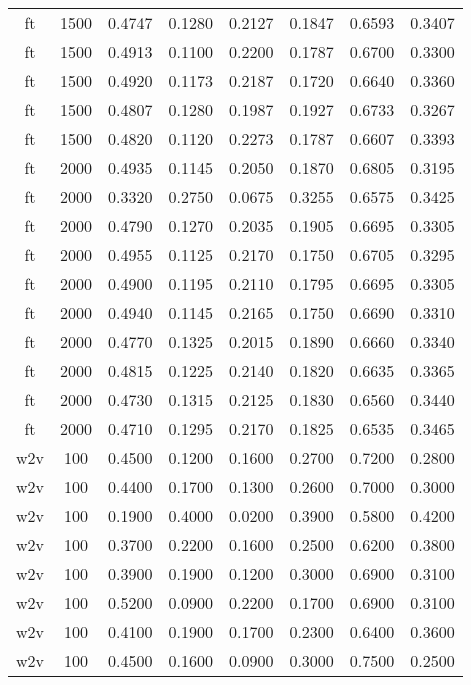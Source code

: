 \begin{scriptsize}
\begin{longtable}{cccccccc}
	ft       & 1500 & 0.4747 & 0.1280 & 0.2127 & 0.1847 & 0.6593 & 0.3407 \\
	ft       & 1500 & 0.4913 & 0.1100 & 0.2200 & 0.1787 & 0.6700 & 0.3300 \\
	ft       & 1500 & 0.4920 & 0.1173 & 0.2187 & 0.1720 & 0.6640 & 0.3360 \\
	ft       & 1500 & 0.4807 & 0.1280 & 0.1987 & 0.1927 & 0.6733 & 0.3267 \\
	ft       & 1500 & 0.4820 & 0.1120 & 0.2273 & 0.1787 & 0.6607 & 0.3393 \\
	ft       & 2000 & 0.4935 & 0.1145 & 0.2050 & 0.1870 & 0.6805 & 0.3195 \\
	ft       & 2000 & 0.3320 & 0.2750 & 0.0675 & 0.3255 & 0.6575 & 0.3425 \\
	ft       & 2000 & 0.4790 & 0.1270 & 0.2035 & 0.1905 & 0.6695 & 0.3305 \\
	ft       & 2000 & 0.4955 & 0.1125 & 0.2170 & 0.1750 & 0.6705 & 0.3295 \\
	ft       & 2000 & 0.4900 & 0.1195 & 0.2110 & 0.1795 & 0.6695 & 0.3305 \\
	ft       & 2000 & 0.4940 & 0.1145 & 0.2165 & 0.1750 & 0.6690 & 0.3310 \\
	ft       & 2000 & 0.4770 & 0.1325 & 0.2015 & 0.1890 & 0.6660 & 0.3340 \\
	ft       & 2000 & 0.4815 & 0.1225 & 0.2140 & 0.1820 & 0.6635 & 0.3365 \\
	ft       & 2000 & 0.4730 & 0.1315 & 0.2125 & 0.1830 & 0.6560 & 0.3440 \\
	ft       & 2000 & 0.4710 & 0.1295 & 0.2170 & 0.1825 & 0.6535 & 0.3465 \\
	w2v      & 100  & 0.4500 & 0.1200 & 0.1600 & 0.2700 & 0.7200 & 0.2800 \\
	w2v      & 100  & 0.4400 & 0.1700 & 0.1300 & 0.2600 & 0.7000 & 0.3000 \\
	w2v      & 100  & 0.1900 & 0.4000 & 0.0200 & 0.3900 & 0.5800 & 0.4200 \\
	w2v      & 100  & 0.3700 & 0.2200 & 0.1600 & 0.2500 & 0.6200 & 0.3800 \\
	w2v      & 100  & 0.3900 & 0.1900 & 0.1200 & 0.3000 & 0.6900 & 0.3100 \\
	w2v      & 100  & 0.5200 & 0.0900 & 0.2200 & 0.1700 & 0.6900 & 0.3100 \\
	w2v      & 100  & 0.4100 & 0.1900 & 0.1700 & 0.2300 & 0.6400 & 0.3600 \\
	w2v      & 100  & 0.4500 & 0.1600 & 0.0900 & 0.3000 & 0.7500 & 0.2500 \\

\end{longtable}
\end{scriptsize}
